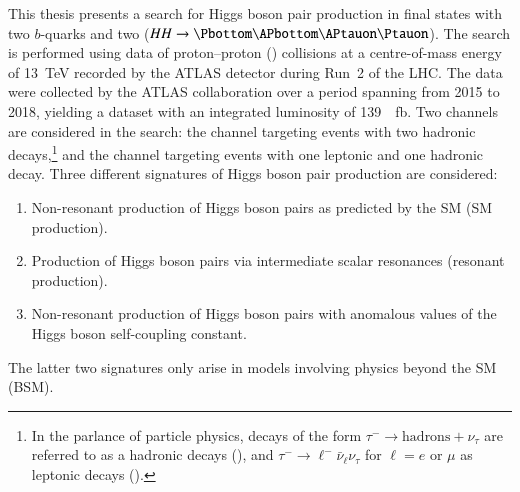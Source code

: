 This thesis presents a search for Higgs boson pair production in final states
with two $b$-quarks and two \tauleptons ($HH \to \bbtautau$). The search is
performed using data of proton--proton (\pp) collisions at a centre-of-mass
energy of \SI{13}{\TeV} recorded by the ATLAS detector during Run~2 of the
LHC. The data were collected by the ATLAS collaboration over a period spanning
from 2015 to 2018, yielding a dataset with an integrated luminosity of
\SI{139}{\per\femto\barn}. Two channels are considered in the search: the
\hadhad channel targeting events with two hadronic \taulepton
decays,\footnote{In the parlance of particle physics, decays of the form
  $\tau^- \to \text{hadrons} + \nu_\tau$ are referred to as a hadronic
  \taulepton decays (\tauhad), and $\tau^- \to \ell^- \bar{\nu}_\ell \nu_\tau$
  for $\ell = e$ or $\mu$ as leptonic \taulepton decays (\taulep).} and the
\lephad channel targeting events with one leptonic and one hadronic \taulepton
decay. Three different signatures of Higgs boson pair production are considered:
\begin{enumerate}

\item Non-resonant production of Higgs boson pairs as predicted by the SM (SM
  \HH production).

\item Production of Higgs boson pairs via intermediate scalar resonances
  (resonant \HH production).

\item Non-resonant production of Higgs boson pairs with anomalous values of the
  Higgs boson self-coupling constant.

\end{enumerate}
The latter two signatures only arise in models involving physics beyond the SM
(BSM).










